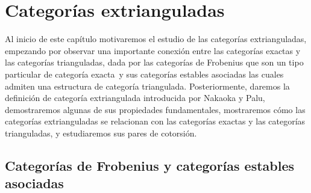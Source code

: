 \documentclass[tesis]{subfiles}
\begin{document}
\chapter{Categorías extrianguladas} \label{Chap: Categorías extrianguladas}

Al inicio de este capítulo motivaremos el estudio de las categorías extrianguladas, empezando por observar una importante conexión entre las categorías exactas y las categorías trianguladas, dada por las categorías de Frobenius \textemdash que son un tipo particular de categoría exacta\textemdash \ y sus categorías estables asociadas \textemdash las cuales admiten una estructura de categoría triangulada. Posteriormente, daremos la definición de categoría extriangulada introducida por Nakaoka y Palu\cite{NakaokaPalu}, demostraremos algunas de sus propiedades fundamentales, mostraremos cómo las categorías extrianguladas se relacionan con las categorías exactas y las categorías trianguladas, y estudiaremos sus pares de cotorsión.

\section{Categorías de Frobenius y categorías estables asociadas}\label{Sec: Categorías de Frobenius y categorías estables asociadas}
\end{document}
